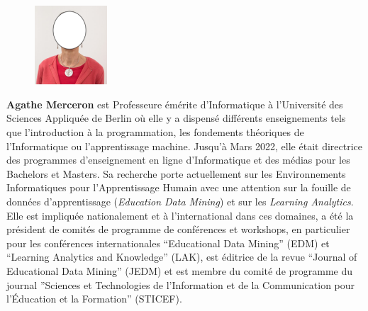 \begin{figure}
	\centering\includegraphics[width=0.24\textwidth]{Content/figures/AgatheMerceron}
\end{figure}
\textbf{Agathe Merceron} est Professeure émérite d’Informatique à l’Université des
Sciences Appliquée de Berlin où  elle y a dispensé différents enseignements
tels que l’introduction à la programmation, les fondements théoriques de
l’Informatique ou l’apprentissage machine. 
Jusqu'à Mars 2022, elle était directrice des programmes d'enseignement en ligne d'Informatique et des  médias pour les Bachelors et Masters. 
Sa recherche porte actuellement sur les Environnements Informatiques pour l'Apprentissage Humain avec une attention sur la fouille de données d'apprentissage (\textit{Education Data Mining}) et sur les \textit{Learning Analytics}. 
Elle est impliquée nationalement et à l'international dans ces domaines, a été la président de comités de programme de conférences et workshops, en particulier pour les conférences internationales ``Educational Data Mining'' (EDM) et ``Learning Analytics and Knowledge'' (LAK), est éditrice de la revue  ``Journal of Educational Data Mining'' (JEDM) et est membre du comité de programme du journal ''Sciences et Technologies de l'Information et de la  Communication pour l'Éducation et la Formation'' (STICEF).





